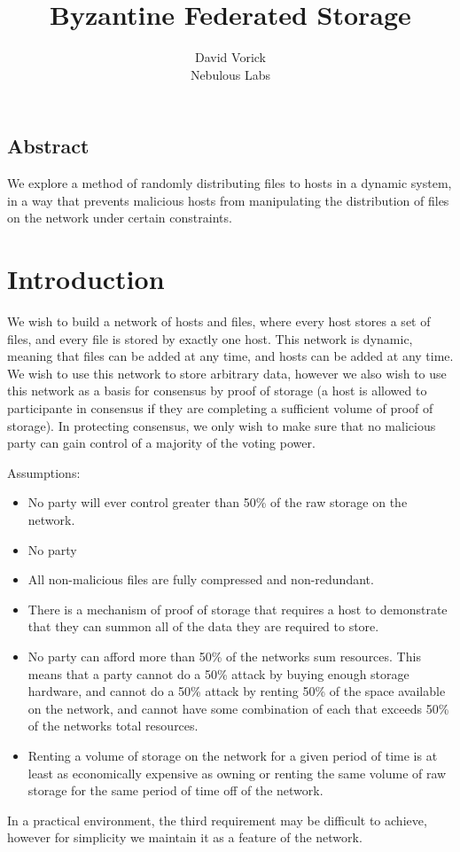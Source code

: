 \documentclass[twocolumn]{article}
\begin{document}
\frenchspacing

\title{Byzantine Federated Storage}

\author{
{\rm David Vorick}\\
Nebulous Labs
}

\maketitle

\subsection*{Abstract}
We explore a method of randomly distributing files to hosts in a dynamic system, in a way that prevents malicious hosts from manipulating the distribution of files on the network under certain constraints.

\section{Introduction}
We wish to build a network of hosts and files, where every host stores a set of files, and every file is stored by exactly one host.
This network is dynamic, meaning that files can be added at any time, and hosts can be added at any time.
We wish to use this network to store arbitrary data, however we also wish to use this network as a basis for consensus by proof of storage (a host is allowed to participante in consensus if they are completing a sufficient volume of proof of storage).
In protecting consensus, we only wish to make sure that no malicious party can gain control of a majority of the voting power.

Assumptions:
\begin{itemize}
	\item No party will ever control greater than 50\% of the raw storage on the network.
	\item No party
	\item All non-malicious files are fully compressed and non-redundant.
	\item There is a mechanism of proof of storage that requires a host to demonstrate that they can summon all of the data they are required to store.
	\item No party can afford more than 50\% of the networks sum resources. This means that a party cannot do a 50\% attack by buying enough storage hardware, and cannot do a 50\% attack by renting 50\% of the space available on the network, and cannot have some combination of each that exceeds 50\% of the networks total resources.
	\item Renting a volume of storage on the network for a given period of time is at least as economically expensive as owning or renting the same volume of raw storage for the same period of time off of the network.
\end{itemize}
In a practical environment, the third requirement may be difficult to achieve, however for simplicity we maintain it as a feature of the network.
\end{document}
